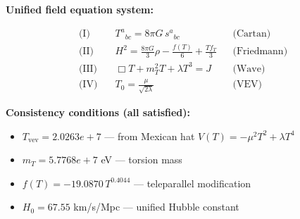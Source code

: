 
\textbf{Unified field equation system:}

\begin{align}
  \text{(I)} \quad & T^a{}_{bc} = 8\pi G \, s^a{}_{bc} && \text{(Cartan)} \\
  \text{(II)} \quad & H^2 = \frac{8\pi G}{3}\rho - \frac{f(T)}{6} + \frac{Tf_T}{3} && \text{(Friedmann)} \\
  \text{(III)} \quad & \Box T + m_T^2 T + \lambda T^3 = J && \text{(Wave)} \\
  \text{(IV)} \quad & T_0 = \frac{\mu}{\sqrt{2\lambda}} && \text{(VEV)}
\end{align}

\textbf{Consistency conditions (all satisfied):}
\begin{itemize}
  \item $T_{\text{vev}} = 2.0263e+7$ — from Mexican hat $V(T) = -\mu^2 T^2 + \lambda T^4$
  \item $m_T = 5.7768e+7$ eV — torsion mass
  \item $f(T) = -19.0870 \, T^{0.4044}$ — teleparallel modification
  \item $H_0 = 67.55$ km/s/Mpc — unified Hubble constant
\end{itemize}